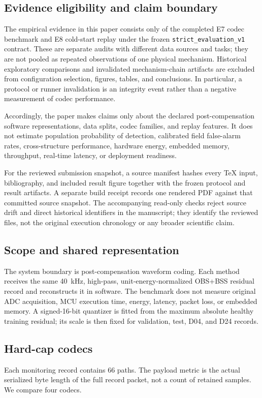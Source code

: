 \subsection{Evidence eligibility and claim boundary}
The empirical evidence in this paper consists only of the completed E7 codec
benchmark and E8 cold-start replay under the frozen
\texttt{strict\_evaluation\_v1} contract. These are separate audits with
different data sources and tasks; they are not pooled as repeated observations
of one physical mechanism. Historical exploratory comparisons and invalidated
mechanism-chain artifacts are excluded from configuration selection, figures,
tables, and conclusions. In particular, a protocol or runner invalidation is
an integrity event rather than a negative measurement of codec performance.

Accordingly, the paper makes claims only about the declared post-compensation
software representations, data splits, codec families, and replay features.
It does not estimate population probability of detection, calibrated field
false-alarm rates, cross-structure performance, hardware energy, embedded
memory, throughput, real-time latency, or deployment readiness.

For the reviewed submission snapshot, a source manifest hashes every TeX
input, bibliography, and included result figure together with the frozen
protocol and result artifacts. A separate build receipt records one rendered
PDF against that committed source snapshot. The accompanying read-only checks
reject source drift and direct historical identifiers in the manuscript; they
identify the reviewed files, not the original execution chronology or any
broader scientific claim.

\subsection{Scope and shared representation}
The system boundary is post-compensation waveform coding. Each method receives
the same 40~kHz, high-pass, unit-energy-normalized OBS+BSS residual record
and reconstructs it in software. The benchmark does not measure original ADC
acquisition, MCU execution time, energy, latency, packet loss, or embedded
memory. A signed-16-bit quantizer is fitted from the maximum absolute healthy
training residual; its scale is then fixed for validation, test, D04, and
D24 records.

\subsection{Hard-cap codecs}
Each monitoring record contains 66 paths. The payload metric is the actual
serialized byte length of the full record packet, not a count of retained
samples. We compare four codecs.

